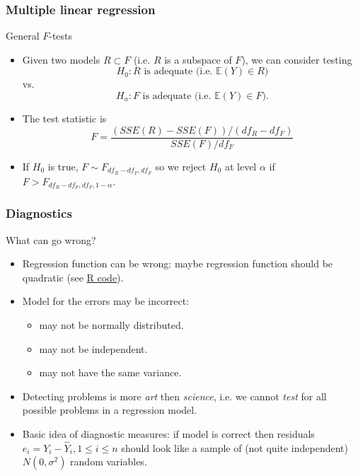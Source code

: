 \documentclass[handout]{beamer}
\newcommand{\basename}[1]{http://stats191.stanford.edu/#1}
\newcommand{\mycolor}[1]{{\color{blue} #1}}
\newcommand{\Rhref}[2]{\href{\basename{R/#1}}{\mycolor{#2}}}
\begin{document}
   \begin{frame} \frametitle{Multiple linear regression}

   \begin{block}
   { General   $F$-tests}
   \begin{itemize}
   \item Given two models $R \subset F$ (i.e. $R$ is a subspace of $F$),
   we can consider testing
   $$
   H_0: \text{$R$ is adequate (i.e. $\mathbb{E}(Y) \in R$)}$$
   vs.
   $$
   H_a: \text{$F$ is adequate (i.e. $\mathbb{E}(Y) \in F$)}.$$

   \item The test statistic is
   $$
   F = \frac{(SSE(R) - SSE(F)) / (df_R - df_F)}{SSE(F)/df_F}$$

   \item If $H_0$ is true, $F \sim F_{df_R-df_F, df_F}$ so we reject
   $H_0$ at level $\alpha$ if  $F > F_{df_R-df_F, df_F, 1-\alpha}$.
   \end{itemize}
   \end{block}
   \end{frame}


   \begin{frame} \frametitle{Diagnostics}

   \begin{block}
   {What can go wrong?}

   \begin{itemize}[<+->]

   \item
   Regression function can be wrong: maybe regression function should be quadratic
   (see \Rhref{simple_diagnostics/anscombeout.html}{R code}).

   \item Model for the errors
   may be incorrect:
   \begin{itemize}
   \item  may not be normally distributed.
   \item  may not be independent.

   \item  may not have the same variance.
   \end{itemize}

   \item Detecting problems is more {\em art} then {\em science}, i.e.
   we cannot {\em test} for all possible problems in a regression model.

   \item Basic idea of diagnostic measures: if model is correct then
   residuals $e_i = Y_i -\widehat{Y}_i, 1 \leq i \leq n$ should look like a sample of
   (not quite independent) $N(0, \sigma^2)$ random variables.
   \end{itemize}
   \end{block}
   \end{frame}
\end{document}
